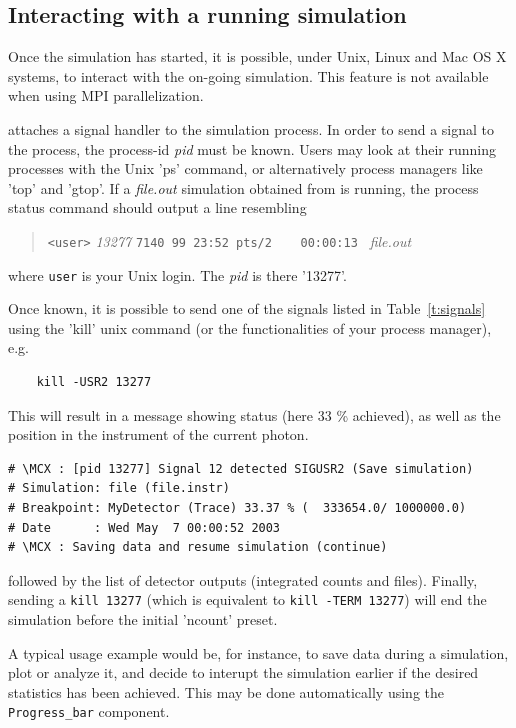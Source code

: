 \subsection{Interacting with a running simulation}

Once the simulation has started, it is possible, under Unix, Linux and Mac OS X systems, to interact with the on-going simulation. This feature is not available when using MPI parallelization.

\MCX attaches a signal handler to the simulation process. In order to send a signal to the process, the process-id \textit{pid} must be known. Users may look at their running processes with the Unix 'ps' command, or alternatively process managers like 'top' and 'gtop'.
If a \textit{file.out} simulation obtained from \MCX is running, the process status command should output a line resembling
\begin{quote}
  \verb|<user>| \textit{13277} \verb|7140 99 23:52 pts/2    00:00:13 | \textit{file.out}\\
\end{quote}
where \verb+user+ is your Unix login. The \textit{pid} is there '13277'.

Once known, it is possible to send one of the signals listed in Table~\ref{t:signals} using the 'kill' unix command (or the functionalities of your process manager), e.g.
\begin{verbatim}
    kill -USR2 13277
\end{verbatim}
This will result in a message showing status (here 33 \% achieved), as well as the position in the instrument of the current photon.
\begin{verbatim}
# \MCX : [pid 13277] Signal 12 detected SIGUSR2 (Save simulation)
# Simulation: file (file.instr)
# Breakpoint: MyDetector (Trace) 33.37 % (  333654.0/ 1000000.0)
# Date      : Wed May  7 00:00:52 2003
# \MCX : Saving data and resume simulation (continue)
\end{verbatim}
followed by the list of detector outputs (integrated counts and files). Finally, sending a \verb+kill 13277+ (which is equivalent to \verb+kill -TERM 13277+) will end the simulation before the initial 'ncount' preset.

A typical usage example would be, for instance, to save data during a
simulation, plot or analyze it, and decide to interupt the simulation
earlier if the desired statistics has been achieved. This may be done automatically using the \verb+Progress_bar+ component.

